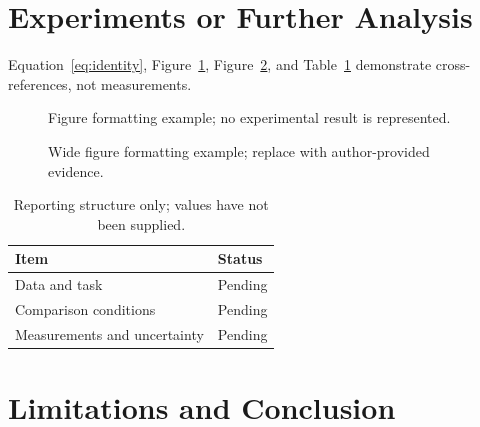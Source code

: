 \section{Experiments or Further Analysis}
\label{sec:results}
Equation~\ref{eq:identity}, Figure~\ref{fig:single}, Figure~\ref{fig:wide}, and
Table~\ref{tab:conditions} demonstrate cross-references, not measurements.
\begin{figure}[htbp]
\centering
{}
\caption{Figure formatting example; no experimental result is represented.}
\label{fig:single}
\end{figure}
\begin{figure}[t]
\centering
{}
\caption{Wide figure formatting example; replace with author-provided evidence.}
\label{fig:wide}
\end{figure}
\begin{table}[htbp]
\centering
\caption{Reporting structure only; values have not been supplied.}
\label{tab:conditions}
\begin{tabular}{ll}
\hline
Item & Status\\
\hline
Data and task & Pending\\
Comparison conditions & Pending\\
Measurements and uncertainty & Pending\\
\hline
\end{tabular}
\end{table}

\section{Limitations and Conclusion}
\label{pw:main-end}
